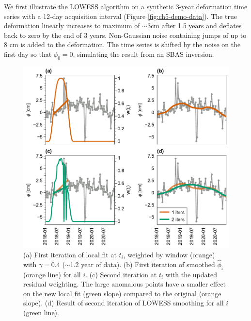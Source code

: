 We first illustrate the LOWESS algorithm on a synthetic 3-year deformation time series with a 12-day acquisition interval (Figure \ref{fig:ch5-demo-data}).
The true deformation linearly increases to maximum of $ \sim3 $cm after 1.5 years and deflates back to zero by the end of 3 years. 
Non-Gaussian noise containing jumps of up to 8 cm is added to the deformation.
The time series is shifted by the noise on the first day so that $ \phi_0 = 0 $, simulating the result from an SBAS inversion.



\begin{figure}
	\centering
	\includegraphics[width=.95\textwidth]{figures/chapter5-lowess/figure3-fits.pdf}
	\caption[Demo of LOWESS fitting]{
		(a) First iteration of local fit at $t_i$, weighted by window (orange) with $ \gamma=0.4 $ ($ \sim $1.2 year of data). 
		(b) First iteration of smoothed $ \hat{\phi}_i $ (orange line) for all $i$. 
		(c) Second iteration at $t_i$ with the updated residual weighting. The large anomalous points have a smaller effect on the new local fit (green slope) compared to the original (orange slope).
		(d) Result of second iteration of LOWESS smoothing for all $i$ (green line).
	}
	\label{fig:ch5-algo-demo}
\end{figure}



